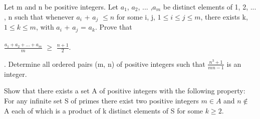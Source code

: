\item Let m and n be positive integers. Let $a_1$, $a_2$, ... ,$a_m$ be distinct elements of {1, 2, ... , n} such that whenever $a_i$ + $a_j$ $\leq n$ for some i, j, $1 \leq i \leq j \leq m$,
there exists k, $1 \leq k \leq m$, with $a_i$ + $a_j$ = $a_k$. Prove that\\
\\ $\frac{a_1+a_2+...+a_m}{m}$ $\geq$ $\frac{n+1}{2}$.\\

\item . Determine all ordered pairs (m, n) of positive integers such that $\frac{n^3+1}{mn-1}$ is an integer.\\

\item Show that there exists a set A of positive integers with the following property: For any infinite set S of primes there exist two positive integers $m \in A$ and $n \notin$ A each of which is a product of k distinct elements of S for some $k\geq 2$.




